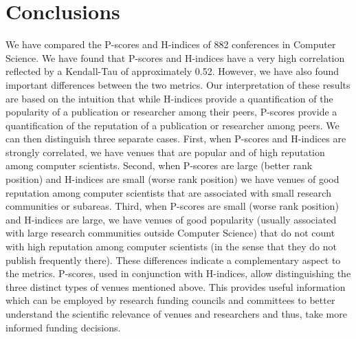 \documentclass[man]{apa6}
\begin{document}
\section{Conclusions}
\label{sec:conclusions}

We have compared the P-scores and H-indices of 882 conferences in Computer Science. 
We have found that P-scores and H-indices have a very high correlation reflected by a Kendall-Tau of 
approximately 0.52. However,
we have also found important differences between the two metrics.
Our interpretation of these results are based on the intuition that while H-indices provide a quantification of the popularity of a publication or researcher among their peers, P-scores provide a quantification of the reputation of a publication or researcher among peers. We can then distinguish three separate cases. First, when P-scores and H-indices are strongly correlated, we have venues that are popular and of high reputation among computer scientists. Second, when P-scores are large (better rank position) and H-indices are small (worse rank position) we have venues of good reputation among computer scientists that are associated with small research communities or subareas. Third, when P-scores are small (worse rank position) and H-indices are large, we have venues of good popularity (usually associated with large research communities outside Computer Science) that do not count with high reputation among computer scientists (in the sense that they do not publish frequently there).
These differences indicate a complementary aspect to the metrics. P-scores, used in conjunction with H-indices, allow distinguishing the three distinct types of venues mentioned above. This provides useful information which
can be employed
by research funding councils and committees to better understand 
the scientific relevance of venues and researchers and thus, take more informed funding decisions.

\printbibliography
\end{document}
